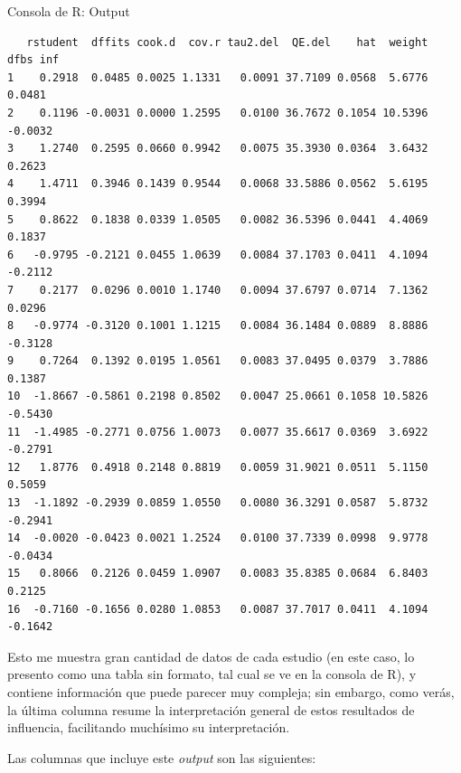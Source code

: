 \documentclass[
  bookmarksnumbered]{article}
\begin{document}
\begin{ROut}{Consola de R: Output~\thetcbcounter}
                \begin{footnotesize}
                \begin{verbatim} 
   rstudent  dffits cook.d  cov.r tau2.del  QE.del    hat  weight    dfbs inf 
1    0.2918  0.0485 0.0025 1.1331   0.0091 37.7109 0.0568  5.6776  0.0481     
2    0.1196 -0.0031 0.0000 1.2595   0.0100 36.7672 0.1054 10.5396 -0.0032     
3    1.2740  0.2595 0.0660 0.9942   0.0075 35.3930 0.0364  3.6432  0.2623     
4    1.4711  0.3946 0.1439 0.9544   0.0068 33.5886 0.0562  5.6195  0.3994     
5    0.8622  0.1838 0.0339 1.0505   0.0082 36.5396 0.0441  4.4069  0.1837     
6   -0.9795 -0.2121 0.0455 1.0639   0.0084 37.1703 0.0411  4.1094 -0.2112     
7    0.2177  0.0296 0.0010 1.1740   0.0094 37.6797 0.0714  7.1362  0.0296     
8   -0.9774 -0.3120 0.1001 1.1215   0.0084 36.1484 0.0889  8.8886 -0.3128     
9    0.7264  0.1392 0.0195 1.0561   0.0083 37.0495 0.0379  3.7886  0.1387     
10  -1.8667 -0.5861 0.2198 0.8502   0.0047 25.0661 0.1058 10.5826 -0.5430     
11  -1.4985 -0.2771 0.0756 1.0073   0.0077 35.6617 0.0369  3.6922 -0.2791     
12   1.8776  0.4918 0.2148 0.8819   0.0059 31.9021 0.0511  5.1150  0.5059     
13  -1.1892 -0.2939 0.0859 1.0550   0.0080 36.3291 0.0587  5.8732 -0.2941     
14  -0.0020 -0.0423 0.0021 1.2524   0.0100 37.7339 0.0998  9.9778 -0.0434     
15   0.8066  0.2126 0.0459 1.0907   0.0083 35.8385 0.0684  6.8403  0.2125     
16  -0.7160 -0.1656 0.0280 1.0853   0.0087 37.7017 0.0411  4.1094 -0.1642     
 \end{verbatim}
                \end{footnotesize}
                \end{ROut}

Esto me muestra gran cantidad de datos de cada estudio (en este caso, lo presento como una tabla sin formato, tal cual se ve en la consola de R), y contiene información que puede parecer muy compleja; sin embargo, como verás, la última columna resume la interpretación general de estos resultados de influencia, facilitando muchísimo su interpretación.

Las columnas que incluye este \emph{output} son las siguientes:
\end{document}
